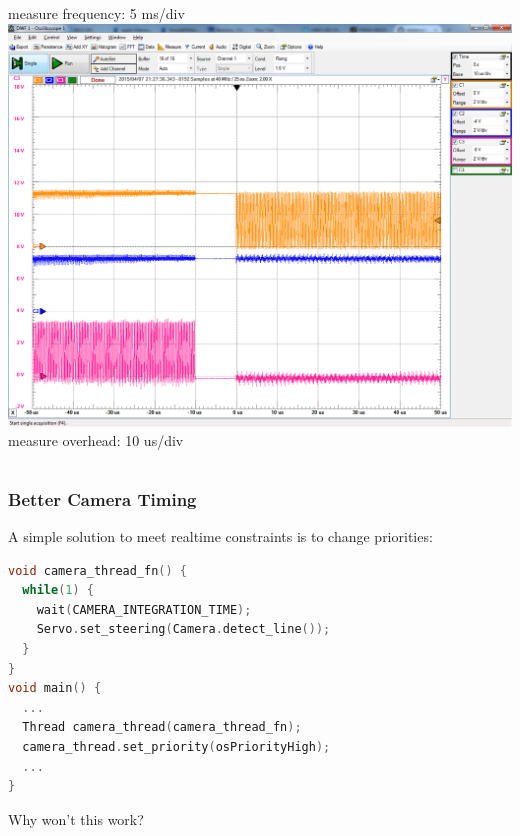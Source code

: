 \documentclass{beamer}
\begin{document}
\begin{frame}
\begin{columns}[t]
{{measure frequency: 5 ms/div \\
\vspace{5px}
\includegraphics[width=1.0\columnwidth]{images-dis10/threading_cswitch3} \\
measure overhead: 10 us/div
}}
\end{columns}
\end{frame}

\begin{frame}[fragile]
\frametitle{Better Camera Timing}
A simple solution to meet realtime constraints is to change priorities:
\vspace{2px}
\begin{lstlisting}[language=C++,basicstyle=\ttfamily\scriptsize]
void camera_thread_fn() {
  while(1) {
    wait(CAMERA_INTEGRATION_TIME);
    Servo.set_steering(Camera.detect_line());      
  }
}
void main() {
  ...
  Thread camera_thread(camera_thread_fn);
  camera_thread.set_priority(osPriorityHigh);
  ...
}
\end{lstlisting}
\vspace{2px}
Why won't this work?
\end{frame}
\end{document}
